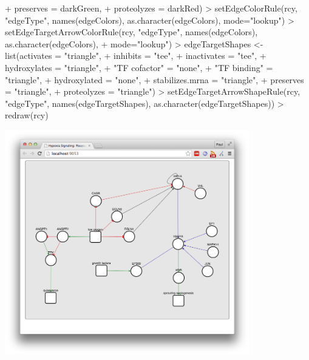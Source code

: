 \documentclass{article}
\begin{document}
\begin{Schunk}
\begin{Sinput}
+                    preserves = darkGreen,
+                    proteolyzes = darkRed)
> setEdgeColorRule(rcy, "edgeType", names(edgeColors), as.character(edgeColors), mode="lookup")
> setEdgeTargetArrowColorRule(rcy, "edgeType", names(edgeColors), as.character(edgeColors),
+                             mode="lookup")
> edgeTargetShapes <- list(activates = "triangle",
+                          inhibits = "tee",
+                          inactivates = "tee",
+                          hydroxylates = "triangle",
+                          "TF cofactor" = "none",
+                          "TF binding" = "triangle",
+                          hydroxylated = "none",
+                          stabilizes.mrna = "triangle",
+                          preserves = "triangle",
+                          proteolyzes = "triangle")
> setEdgeTargetArrowShapeRule(rcy, "edgeType", names(edgeTargetShapes), as.character(edgeTargetShapes))
> redraw(rcy)
\end{Sinput}
\end{Schunk}
  
\includegraphics[width=0.8\textwidth]{hypoxiaNetwork.png}
\end{document}
